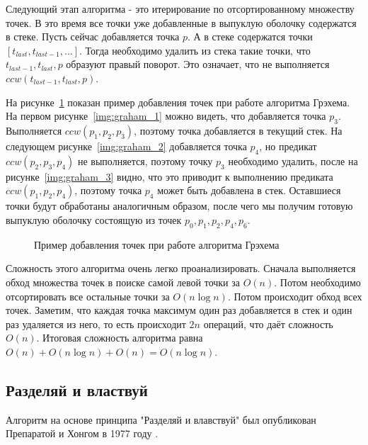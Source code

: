 Следующий этап алгоритма - это итерирование по отсортированному множеству точек. В это время все точки уже добавленные в выпуклую оболочку содержатся в стеке. Пусть сейчас добавляется точка $p$. А в стеке содержатся точки $[t_{last}, t_{last-1}, ...]$. Тогда необходимо удалить из стека такие точки, что $t_{last-1}, t_{last}, p$ образуют правый поворот. Это означает, что не выполняется $ccw(t_{last-1}, t_{last}, p)$.

На рисунке~\ref{img:graham} показан пример добавления точек при работе алгоритма Грэхема. На первом рисунке~\ref{img:graham_1} можно видеть, что добавляется точка $p_3$. Выполняется $ccw(p_1, p_2, p_3)$, поэтому точка добавляется в текущий стек. На следующем рисунке~\ref{img:graham_2} добавляется точка $p_4$, но предикат $ccw(p_2, p_3, p_4)$ не выполняется, поэтому точку $p_3$ необходимо удалить, после на рисунке~\ref{img:graham_3} видно, что это приводит к выполнению предиката $ccw(p_1, p_2, p_4)$, поэтому точка $p_4$ может быть добавлена в стек. Оставшиеся точки будут обработаны аналогичным образом, после чего мы получим готовую выпуклую оболочку состоящую из точек $p_0, p_1, p_2, p_4, p_6$.

\begin{figure}[H]
	{\centering
		\hfill
		\subbottom[\label{img:graham_1}]{%
			}
		\hfill
		\subbottom[\label{img:graham_2}]{%
			}
		\hfill
		\subbottom[\label{img:graham_3}]{%
			}
		\hfill
	}
	\caption{Пример добавления точек при работе алгоритма Грэхема}
	\label{img:graham}
\end{figure}

Сложность этого алгоритма очень легко проанализировать. Сначала выполняется обход множества точек в поиске самой левой точки за $O(n)$. Потом необходимо отсортировать все остальные точки за $O(n \log n)$. Потом происходит обход всех точек. Заметим, что каждая точка максимум один раз добавляется в стек и один раз удаляется из него, то есть происходит $2n$ операций, что даёт сложность $O(n)$. Итоговая сложность алгоритма равна $O(n) + O(n \log n) + O(n) = O(n \log n)$.

\subsection{Разделяй и властвуй} \label{subsect1_1_3}

Алгоритм на основе принципа "Разделяй и влавствуй" был опубликован Препаратой и Хонгом в 1977 году \cite{preparata1977DivideAndConquer}.

